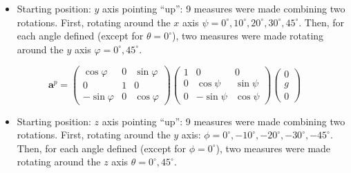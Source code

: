 \documentclass[conference]{IEEEtran}
\begin{document}
 
 
\begin{itemize}
\item Starting position: $y$ axis pointing ``up'': 9 measures were made combining two rotations. First, rotating around the $x$ axis $\psi =0^\circ, 10^\circ, 20^\circ, 30^\circ, 45^\circ$. Then, for each angle defined (except for $\theta = 0^\circ$), two measures were made rotating around the $y$ axis $\varphi = 0^\circ, 45^\circ$.   
\end{itemize}

\begin{scriptsize}
\begin{equation}
\mathbf{a}^p = \left(\begin{array}{ccc}
\cos \varphi & 0 &\sin \varphi\\
0 & 1 & 0\\
-\sin \varphi & 0 & \cos \varphi
\end{array}\right)\left(\begin{array}{ccc}
1 & 0 & 0\\
0 & \cos \psi & \sin \psi \\
0 & -\sin \psi & \cos \psi
\end{array}\right)\left(\begin{array}{c}
0\\
g\\
0
\end{array}\right)
\label{eq:acc_y}
\end{equation}
\end{scriptsize}

\begin{itemize}
\item Starting position: $z$ axis pointing ``up'': 9 measures were made combining two rotations. First, rotating around the $y$ axis: $\phi =0^\circ, -10^\circ, -20^\circ, -30^\circ, -45^\circ$. Then, for each angle defined (except for $\phi = 0^\circ$), two measures were made rotating around the $z$ axis $\theta = 0^\circ, 45^\circ$.   \end{itemize}
\end{document}
